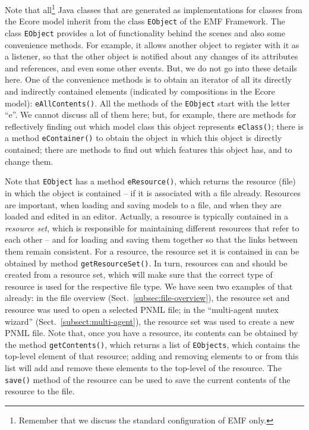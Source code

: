 Note that all\footnote
  {Remember that we discuss the standard configuration of EMF only.}
Java classes that are generated as implementations for classes from the Ecore
model inherit from the class {\tt EObject}%
of the EMF Framework. The class {\tt EObject} provides a lot of functionality
behind the scenes and also some convenience methods. For example, it allows another object
to register with it as a listener, so that the other object is notified
about any changes of its attributes and references, and even some other events.
But, we do not go into these details here. One of the convenience methods
is to obtain an iterator of all its directly and indirectly contained
elements (indicated by compositions in the Ecore model): {\tt eAllContents()}.%
All the methods of the {\tt EObject} start with the letter ``e''. We
cannot discuss all of them here; but, for example, there are methods for reflectively
finding out which model class this object represents {\tt eClass()};%
there is a method {\tt eContainer()}%
to obtain the object in which this object is directly contained; there are
methods to find out which features this object has, and to change them.

Note that {\tt EObject} has a method {\tt eResource()},%
which returns the resource (file)%
in which the object is contained -- if it is associated with
a file already. Resources are important, when loading and saving
models to a file, and when they are loaded and edited in an editor. Actually,
a resource is typically contained in a \emph{resource set},%
which is responsible for maintaining different resources that refer to each
other -- and for loading and saving them together so that the links between them
remain consistent. For a resource, the resource set it is contained in can be
obtained by method {\tt getResourceSet()}.%
In turn, resources can and should be created from a resource set, which will
make sure that the correct type of resource is used for the respective file type.
We have seen two examples of that already: in the file overview (Sect.~\ref{subsec:file-overview}),
the resource set and resource was used to open a selected PNML file; in the
``multi-agent mutex wizard'' (Sect.~\ref{subsect:multi-agent}), the resource set was used
to create a new PNML file. Note that, once you have a resource, its contents
can be obtained by the method {\tt getContents()},%
which returns a list of {\tt EObjects}, which contains the top-level element of that
resource; adding and removing elements to or from this list will add and remove these
elements to the top-level of the resource.
The {\tt save()}%
method of the resource can be used to save the current contents of the resource
to the file.

